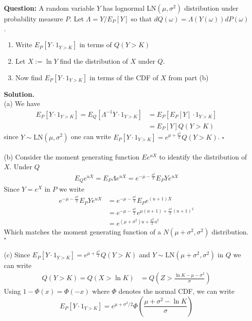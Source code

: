 \documentclass{article}
\begin{document}
\begin{tcolorbox}[colframe=black,colback=gray!5,boxrule=0.5pt]
\textbf{Question:} A random variable $Y$ has lognormal LN$(\mu,\sigma^2)$
distribution under probability measure $P$. Let $\Lambda = Y/E_P[Y]$ so that $dQ(\omega) = \Lambda(Y(\omega))dP(\omega)$. 
\begin{enumerate}[label=(\alph*)]
    \item Write $E_P[Y\cdot 1_{Y>K}]$ in terms of $Q(Y>K)$
    \item Let $X := \ln Y$ find the distribution of $X$ under $Q$. 
    \item Now find $E_P[Y\cdot 1_{Y>K}]$ in terms of the CDF of $X$ from part (b)
\end{enumerate}
\end{tcolorbox}
\textbf{Solution.} \\
(a) We have 
\begin{align*}
    E_P[Y \cdot 1_{Y>K}] = E_Q[\Lambda^{-1} Y \cdot1_{Y>K}] &= E_P[E_P[Y]\cdot 1_{Y>K}] \\
    &=E_P[Y]Q(Y>K)
\end{align*}
since $Y\sim\text{LN}(\mu,\sigma^2)$ one can write $E_P[Y\cdot1_{Y>K}] = e^{\mu+\frac{\sigma^2}{2}}Q(Y>K)$. $\square$ \\
\\
(b) Consider the moment generating function $Ee^{uX}$ to identify the distribution of $X$. Under $Q$
\begin{align*}
    E_Qe^{uX} = E_P\Lambda e^{uX} = e^{-\mu-\frac{\sigma^2}{2}} E_P Y e^{uX}
\end{align*} 
Since $Y = e^X$ in $P$ we write 
\begin{align*}
    e^{-\mu-\frac{\sigma^2}{2}} E_P Y e^{uX} &= e^{-\mu-\frac{\sigma^2}{2}} E_P e^{(u+1)X} \\
    &= e^{-\mu-\frac{\sigma^2}{2}} e^{\mu(u+1) + \frac{\sigma^2}{2}(u+1)^2} \\
    &= e^{(\mu+\sigma^2)u + \frac{\sigma^2}{2}u^2}
\end{align*} 
Which matches the moment generating function of a $N(\mu+\sigma^2, \sigma^2)$ distribution. $\square$ \\
\\
(c) Since $E_P[Y\cdot1_{Y>K}] = e^{\mu+\frac{\sigma^2}{2}}Q(Y>K)$ and $Y\sim \text{LN}(\mu+\sigma^2,\sigma^2)$ in $Q$ we can write 
\begin{align*}
    Q(Y>K) = Q(X>\ln K)  &= Q\left(Z>\frac{\ln K-\mu-\sigma^2}{\sigma}\right)
\end{align*}
Using $1-\Phi(x) = \Phi(-x)$ where $\Phi$ denotes the normal CDF, we can write 
$$E_P[Y\cdot1_{Y>K}] = e^{\mu+\sigma^2/2}\Phi\left(\frac{\mu+\sigma^2-\ln K}{\sigma}\right)$$
 
\end{document}
